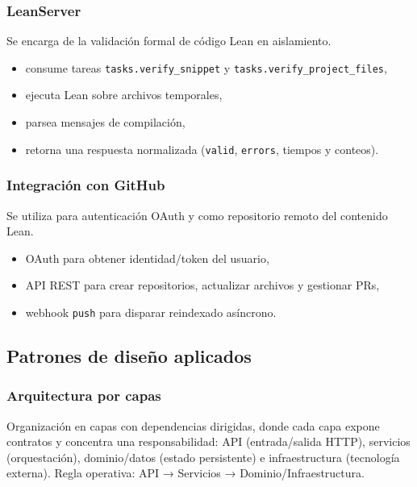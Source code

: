 \documentclass[12pt, letterpaper]{article}
\begin{document}
\subsubsection{LeanServer}

Se encarga de la validación formal de código Lean en aislamiento.

\begin{itemize}
    \item consume tareas \texttt{tasks.verify\_snippet} y \texttt{tasks.verify\_project\_files},
    \item ejecuta Lean sobre archivos temporales,
    \item parsea mensajes de compilación,
    \item retorna una respuesta normalizada (\texttt{valid}, \texttt{errors}, tiempos y conteos).
\end{itemize}

\subsubsection{Integración con GitHub}

Se utiliza para autenticación OAuth y como repositorio remoto del contenido Lean.

\begin{itemize}
    \item OAuth para obtener identidad/token del usuario,
    \item API REST para crear repositorios, actualizar archivos y gestionar PRs,
    \item webhook \texttt{push} para disparar reindexado asíncrono.
\end{itemize}

\subsection{Patrones de diseño aplicados}

\subsubsection{Arquitectura por capas}

Organización en capas con dependencias dirigidas, donde cada capa expone contratos y concentra una responsabilidad: API (entrada/salida HTTP), servicios (orquestación), dominio/datos (estado persistente) e infraestructura (tecnología externa). Regla operativa: API → Servicios → Dominio/Infraestructura.
\end{document}
